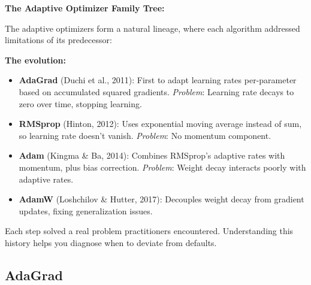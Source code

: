 \documentclass[../../main.tex]{subfiles}
\begin{document}
\begin{keyconcept}
\textbf{The Adaptive Optimizer Family Tree:}

The adaptive optimizers form a natural lineage, where each algorithm addressed limitations of its predecessor:

\begin{center}
\small
{}
\end{center}

\textbf{The evolution:}
\begin{itemize}
    \item \textbf{AdaGrad} (Duchi et al., 2011): First to adapt learning rates per-parameter based on accumulated squared gradients. \textit{Problem}: Learning rate decays to zero over time, stopping learning.
    \item \textbf{RMSprop} (Hinton, 2012): Uses exponential moving average instead of sum, so learning rate doesn't vanish. \textit{Problem}: No momentum component.
    \item \textbf{Adam} (Kingma \& Ba, 2014): Combines RMSprop's adaptive rates with momentum, plus bias correction. \textit{Problem}: Weight decay interacts poorly with adaptive rates.
    \item \textbf{AdamW} (Loshchilov \& Hutter, 2017): Decouples weight decay from gradient updates, fixing generalization issues.
\end{itemize}

Each step solved a real problem practitioners encountered. Understanding this history helps you diagnose when to deviate from defaults.
\end{keyconcept}

\subsection{AdaGrad}
\end{document}
